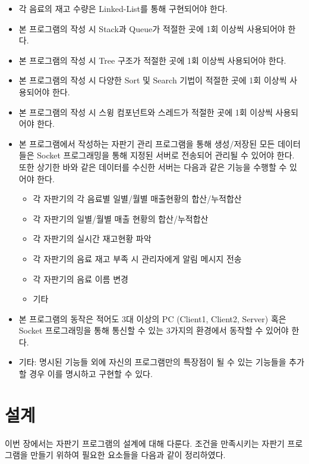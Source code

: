 \documentclass{oblivoir}
\begin{document}
    \begin{itemize}
        \item 각 음료의 재고 수량은 Linked-List를 통해 구현되어야 한다.
        \item 본 프로그램의 작성 시 Stack과 Queue가 적절한 곳에
        1회 이상씩 사용되어야 한다.
        \item 본 프로그램의 작성 시 Tree 구조가 적절한 곳에 1회 이상씩
        사용되어야 한다.
        \item 본 프로그램의 작성 시 다양한 Sort 및 Search 기법이
        적절한 곳에 1회 이상씩 사용되어야 한다.
        \item 본 프로그램의 작성 시 스윙 컴포넌트와 스레드가
        적절한 곳에 1회 이상씩 사용되어야 한다.
        \item 본 프로그램에서 작성하는 자판기 관리 프로그램을 통해
        생성/저장된 모든 데이터들은 Socket 프로그래밍을 통해
        지정된 서버로 전송되어 관리될 수 있어야 한다.
        또한 상기한 바와 같은 데이터를 수신한 서버는
        다음과 같은 기능을 수행할 수 있어야 한다.
        \begin{itemize}
            \item 각 자판기의 각 음료별 일별/월별 매출현황의 합산/누적합산
            \item 각 자판기의 일별/월별 매출 현황의 합산/누적합산
            \item 각 자판기의 실시간 재고현황 파악
            \item 각 자판기의 음료 재고 부족 시 관리자에게 알림 메시지 전송
            \item 각 자판기의 음료 이름 변경
            \item 기타
        \end{itemize}
        \item 본 프로그램의 동작은 적어도 3대 이상의 PC
        (Client1, Client2, Server) 혹은 Socket 프로그래밍을 통해
        통신할 수 있는 3가지의 환경에서 동작할 수 있어야 한다.
        \item 기타: 명시된 기능들 외에 자신의 프로그램만의 특장점이 될 수 있는
        기능들을 추가할 경우 이를 명시하고 구현할 수 있다.
    \end{itemize}

    \section{설계}

    이번 장에서는 자판기 프로그램의 설계에 대해 다룬다.
    조건을 만족시키는 자판기 프로그램을 만들기 위하여 필요한 요소들을
    다음과 같이 정리하였다.
\end{document}
